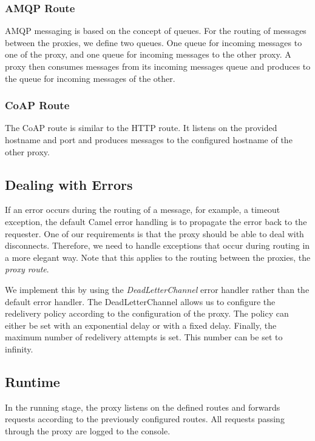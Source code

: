 \subsubsection{AMQP Route}

AMQP messaging is based on the concept of queues. For the routing of messages
 between the proxies, we define two queues.
 One queue for incoming messages to one of the proxy,
 and one queue for incoming messages to the other proxy.
 A proxy then consumes messages from its incoming messages queue
 and produces to the queue for incoming messages of the other.

\subsubsection{CoAP Route}

The CoAP route is similar to the HTTP route. It listens on the provided hostname
and port and produces messages to the configured hostname of the other proxy.


\subsection{Dealing with Errors}

If an error occurs during the routing of a message, for example, a timeout
exception, the default Camel error handling is to propagate the error back to
the requester. One of our requirements is that the proxy should be able to deal
with disconnects. Therefore, we need to handle exceptions that occur during
routing in a more elegant way. Note that this applies to the routing between the
proxies, the \textit{proxy route}.

We implement this by using the \textit{DeadLetterChannel} error handler rather
than the default error handler. The DeadLetterChannel allows us to configure the
redelivery policy according to the configuration of the proxy. The policy can
either be set with an exponential delay or with a fixed delay. Finally, the
maximum number of redelivery attempts is set. This number can be set to
infinity.

\subsection{Runtime}

In the running stage, the proxy listens on the defined routes and forwards
 requests according to the previously configured routes. All requests passing
 through the proxy are logged to the console.


